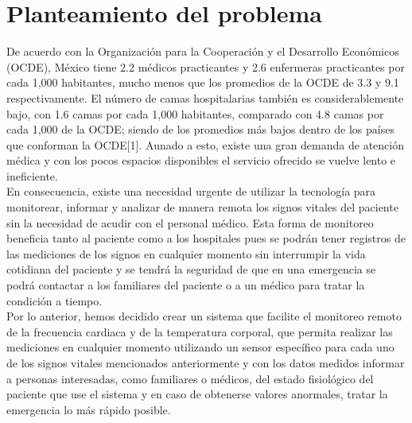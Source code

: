 
\section{Planteamiento del problema}
De acuerdo con la Organización para la Cooperación y el Desarrollo Económicos (OCDE), México tiene 2.2 médicos practicantes y 2.6 enfermeras practicantes por cada 1,000 habitantes, mucho menos que los promedios de la OCDE de 3.3 y 9.1 respectivamente. El número de camas hospitalarias también es considerablemente bajo, con 1.6 camas por cada 1,000 habitantes, comparado con 4.8 camas por cada 1,000 de la OCDE; siendo de los promedios más bajos dentro de los países que conforman la OCDE[1]. Aunado a esto, existe una gran demanda de atención médica y con los pocos espacios disponibles el servicio ofrecido se vuelve lento e ineficiente.\\

En consecuencia, existe una necesidad urgente de utilizar la tecnología para monitorear, informar y analizar de manera remota los signos vitales del paciente sin la necesidad de acudir con el personal médico. Esta forma de monitoreo beneficia tanto al paciente como a los hospitales pues se podrán tener registros de las mediciones de los signos en cualquier momento sin interrumpir la vida cotidiana del paciente y se tendrá la seguridad de que en una emergencia se podrá contactar a los familiares del paciente o a un médico para tratar la condición a tiempo.\\

Por lo anterior, hemos decidido crear un sistema que facilite el monitoreo remoto de la frecuencia cardiaca y de la temperatura corporal, que permita realizar las mediciones en cualquier momento utilizando un sensor específico para cada uno de los signos vitales mencionados anteriormente y con los datos medidos informar a personas interesadas, como familiares o médicos, del estado fisiológico del paciente que use el sistema y en caso de obtenerse valores anormales, tratar la emergencia lo más rápido posible.

